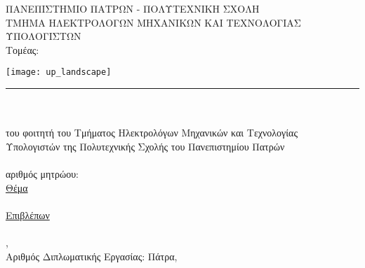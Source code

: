 \begin{titlepage}
\begin{center}
\large{ΠΑΝΕΠΙΣΤΗΜΙΟ ΠΑΤΡΩΝ - ΠΟΛΥΤΕΧΝΙΚΗ ΣΧΟΛΗ}\\
\large{ΤΜΗΜΑ ΗΛΕΚΤΡΟΛΟΓΩΝ ΜΗΧΑΝΙΚΩΝ ΚΑΙ ΤΕΧΝΟΛΟΓΙΑΣ ΥΠΟΛΟΓΙΣΤΩΝ}\\
{Τομέας: \division \\
\lab}

\hfill \break
\texttt{[image: up\_landscape]}\\
\noindent\rule{15cm}{1pt}\\[1cm]

{\uline{\LARGE{\shortdoctitle }}}\\ [0.5cm]
του φοιτητή του Τμήματος Ηλεκτρολόγων Μηχανικών και Τεχνολογίας\\Υπολογιστών της Πολυτεχνικής Σχολής του Πανεπιστημίου Πατρών\\[1cm]

{\LARGE \me }\\[0.5cm]
{\Large αριθμός μητρώου: \studnum}\\[1cm]

\uline{\Large Θέμα}\\[0.5cm]
\textbf{\large \doctitle }\\[1cm]
\uline{\large Επιβλέπων}\\[0.5cm]
\large \supname\\
\suptitle, \supuni \\[1cm]
\large{Αριθμός Διπλωματικής Εργασίας: }\hspace{3cm}
\vfill
\large{Πάτρα, \monthyear}
\end{center}
\end{titlepage}
